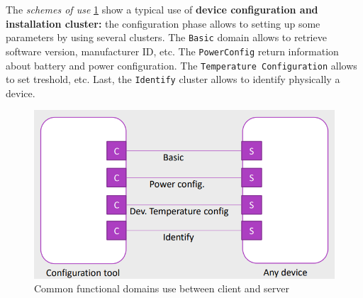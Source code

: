 \documentclass[10pt,a4paper]{report}
\theoremstyle{definition}
\begin{document}
The \textit{schemes of use} \ref{zcl-use-scheme} show a typical use of \textbf{device configuration and installation cluster:} the configuration phase allows to setting up some parameters by using several clusters.
The \texttt{Basic} domain allows to retrieve software version, manufacturer ID, etc. The \texttt{PowerConfig} return information about battery and power configuration. The \texttt{Temperature Configuration} allows to set treshold, etc. Last, the \texttt{Identify} cluster allows to identify physically a device.
\begin{figure}[h]
	\centering\includegraphics[scale=0.40]{images/Pasted image 20230311165919.png}
	\caption{Common functional domains use between client and server}
	\label{zcl-use-scheme}
\end{figure}
\end{document}
